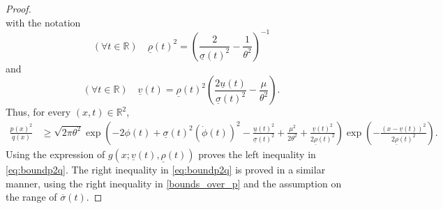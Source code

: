 \documentclass[review]{elsarticle}
\begin{document}
{\begin{proof}
\begin{equation}
\end{equation}
with the notation
\begin{equation}
(\forall t \in \mathbb{R}) \quad \underline{\rho}(t)^2
=
\left(\frac{2}{\underline{\sigma}(t)^2}-\frac{1}{\theta^2}\right)^{-1}
\end{equation}
and
\begin{equation}
(\forall t \in \mathbb{R}) \quad \underline{v}(t)
=
\underline{\rho}(t)^2
\left(
\frac{2\underline{u}(t)}{\underline{\sigma}(t)^2}
-\frac{\mu}{\theta^2}
\right).
\end{equation}
Thus, for every $(x,t) \in \mathbb{R}^2$,
\begin{align}
\frac{p(x)^2}{q(x)}
&\geq
\sqrt{2\pi \theta^2}
\exp\left(
-2\phi(t)
+\underline{\sigma}(t)^2(\dot{\phi}(t))^2
-\frac{\underline{u}(t)^2}{\underline{\sigma}(t)^2}
+\frac{\mu^2}{2\theta^2}
+\frac{\underline{v}(t)^2}{2\underline{\rho}(t)^2}
\right)
\exp\left(
-\frac{(x-\underline{v}(t))^2}{2\underline{\rho}(t)^2}
\right).
\end{align}
    Using the expression of $g(x;\underline{v}(t),\underline{\rho}(t))$ proves the left inequality in \eqref{eq:boundp2q}. The right inequality in \eqref{eq:boundp2q} is proved in a similar manner, using the right inequality in \eqref{bounds_over_p} and the assumption on the range of $\overline{\sigma}(t)$.




\end{proof}}
\end{document}
